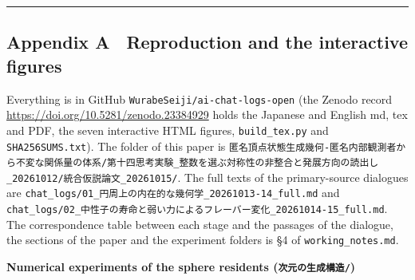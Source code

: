 \documentclass[
  a4paper,
]{article}
\begin{document}
\begin{center}\rule{0.5\linewidth}{0.5pt}\end{center}

\subsection{Appendix A　Reproduction and the interactive
figures}\label{appendix-a-reproduction-and-the-interactive-figures}

Everything is in GitHub \texttt{WurabeSeiji/\allowbreak{}ai-chat-logs-open} (the
Zenodo record \url{https://doi.org/10.5281/zenodo.23384929} holds the Japanese
and English md, tex and PDF, the seven interactive HTML figures,
\texttt{build\_\allowbreak{}tex.py} and \texttt{SHA256SUMS.txt}). The folder of this
paper is
\texttt{匿名頂点状態生成幾何-匿名内部観測者から不変な関係量の体系/\allowbreak{}第十四思考実験\_\allowbreak{}整数を選ぶ対称性の非整合と発展方向の読出し\_\allowbreak{}20261012/\allowbreak{}統合仮説論文\_\allowbreak{}20261015/\allowbreak{}}.
The full texts of the primary-source dialogues are
\texttt{chat\_\allowbreak{}logs/\allowbreak{}01\_\allowbreak{}円周上の内在的な幾何学\_\allowbreak{}20261013-14\_\allowbreak{}full.md} and
\texttt{chat\_\allowbreak{}logs/\allowbreak{}02\_\allowbreak{}中性子の寿命と弱い力によるフレーバー変化\_\allowbreak{}20261014-15\_\allowbreak{}full.md}.
The correspondence table between each stage and the passages of the
dialogue, the sections of the paper and the experiment folders is §4 of
\texttt{working\_\allowbreak{}notes.md}.

\textbf{Numerical experiments of the sphere residents
(\texttt{次元の生成構造/\allowbreak{}})}
\end{document}
